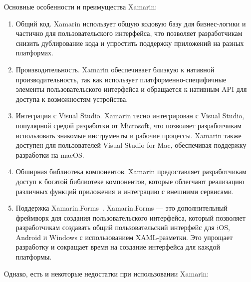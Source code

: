 \documentclass[14pt, russian]{scrartcl}
\begin{document}
Основные особенности и преимущества Xamarin:
\begin{enumerate}
    \item Общий код. Xamarin использует общую кодовую базу для бизнес-логики и частично для пользовательского интерфейса, что позволяет разработчикам снизить дублирование кода и упростить поддержку приложений на разных платформах.
    \item Производительность. Xamarin обеспечивает близкую к нативной производительность, так как использует платформенно-специфичные элементы пользовательского интерфейса и обращается к нативным API для доступа к возможностям устройства.
    \item Интеграция с Visual Studio. Xamarin тесно интегрирован с Visual Studio, популярной средой разработки от Microsoft, что позволяет разработчикам использовать знакомые инструменты и рабочие процессы. Xamarin также доступен для пользователей Visual Studio for Mac, обеспечивая поддержку разработки на macOS.
    \item Обширная библиотека компонентов. Xamarin предоставляет разработчикам доступ к богатой библиотеке компонентов, которые облегчают реализацию различных функций приложения и интеграцию с внешними сервисами.
    \item Поддержка Xamarin.Forms~\cite{xamanin-forms}. Xamarin.Forms –-- это дополнительный фреймворк для создания пользовательского интерфейса, который позволяет разработчикам создавать общий пользовательский интерфейс для iOS, Android и Windows с использованием XAML-разметки. Это упрощает разработку и сокращает время на создание интерфейса для каждой платформы.
\end{enumerate}

Однако, есть и некоторые недостатки при использовании Xamarin:
\end{document}
